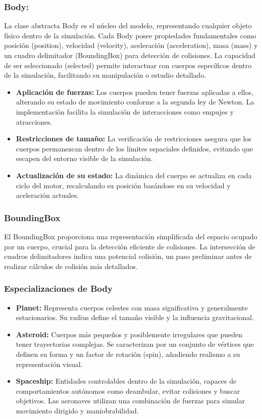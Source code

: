 \subsubsection{\textbf{Body:}}
La clase abstracta Body es el núcleo del modelo, representando cualquier objeto físico dentro de la simulación. Cada Body posee propiedades fundamentales como posición (position), velocidad (velocity), aceleración (acceleration), masa (mass) y un cuadro delimitador (BoundingBox) para detección de colisiones. La capacidad de ser seleccionado (selected) permite interactuar con cuerpos específicos dentro de la simulación, facilitando su manipulación o estudio detallado.
\begin{itemize}
    \item \textbf{Aplicación de fuerzas:} Los cuerpos pueden tener fuerzas aplicadas a ellos, alterando su estado de movimiento conforme a la segunda ley de Newton. La implementación facilita la simulación de interacciones como empujes y atracciones.
    \item \textbf{Restricciones de tamaño:} La verificación de restricciones asegura que los cuerpos permanezcan dentro de los límites espaciales definidos, evitando que escapen del entorno visible de la simulación.
    \item \textbf{Actualización de su estado:} La dinámica del cuerpo se actualiza en cada ciclo del motor, recalculando su posición basándose en su velocidad y aceleración actuales.
\end{itemize}
\subsubsection{\textbf{BoundingBox}}
El BoundingBox proporciona una representación simplificada del espacio ocupado por un cuerpo, crucial para la detección eficiente de colisiones. La intersección de cuadros delimitadores indica una potencial colisión, un paso preliminar antes de realizar cálculos de colisión más detallados.
\subsubsection{\textbf{Especializaciones de Body}}
\begin{itemize}
    \item \textbf{Planet:} Representa cuerpos celestes con masa significativa y generalmente estacionarios. Su radius define el tamaño visible y la influencia gravitacional.
    \item \textbf{Asteroid:} Cuerpos más pequeños y posiblemente irregulares que pueden tener trayectorias complejas. Se caracterizan por un conjunto de vértices que definen su forma y un factor de rotación (spin), añadiendo realismo a su representación visual.
    \item \textbf{Spaceship:} Entidades controlables dentro de la simulación, capaces de comportamientos autónomos como deambular, evitar colisiones y buscar objetivos. Las aeronaves utilizan una combinación de fuerzas para simular movimiento dirigido y maniobrabilidad.
\end{itemize}
